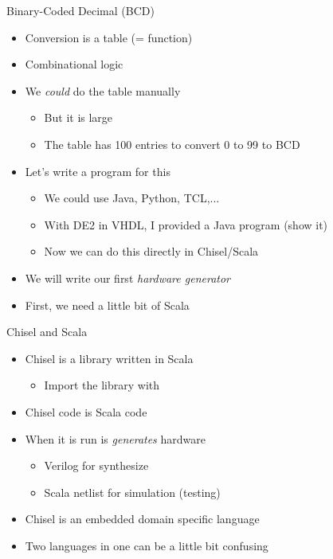 \begin{frame}[fragile]{Binary-Coded Decimal (BCD)}
\begin{itemize}
\item Conversion is a table (= function)
\item Combinational logic
\item We \emph{could} do the table manually
\begin{itemize}
\item But it is large
\item The table has 100 entries to convert 0 to 99 to BCD
\end{itemize}
\item Let's write a program for this
\begin{itemize}
\item We could use Java, Python, TCL,...
\item With DE2 in VHDL, I provided a Java program (show it)
\item Now we can do this directly in Chisel/Scala
\end{itemize}
\item We will write our first \emph{hardware generator}
\item First, we need a little bit of Scala
\end{itemize}
\end{frame}



\begin{frame}[fragile]{Chisel and Scala}
\begin{itemize}
\item Chisel is a library written in Scala
\begin{itemize}
\item Import the library with 
\end{itemize}
\item Chisel code is Scala code
\item When it is run is \emph{generates} hardware
\begin{itemize}
\item Verilog for synthesize
\item Scala netlist for simulation (testing)
\end{itemize}
\item Chisel is an embedded domain specific language
\item Two languages in one can be a little bit confusing
\end{itemize}
\end{frame}

